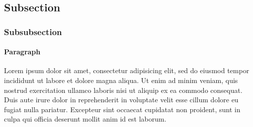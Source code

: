 \documentclass[twoside,11pt]{article}
\begin{document}
	\subsection{Subsection}
		\subsubsection{Subsubsection}
			\paragraph{Paragraph} Lorem ipsum dolor sit amet, consectetur adipisicing elit, sed do eiusmod
			tempor incididunt ut labore et dolore magna aliqua. Ut enim ad minim veniam,
			quis nostrud exercitation ullamco laboris nisi ut aliquip ex ea commodo
			consequat. Duis aute irure dolor in reprehenderit in voluptate velit esse
			cillum dolore eu fugiat nulla pariatur. Excepteur sint occaecat cupidatat non
			proident, sunt in culpa qui officia deserunt mollit anim id est laborum.
\end{document}
